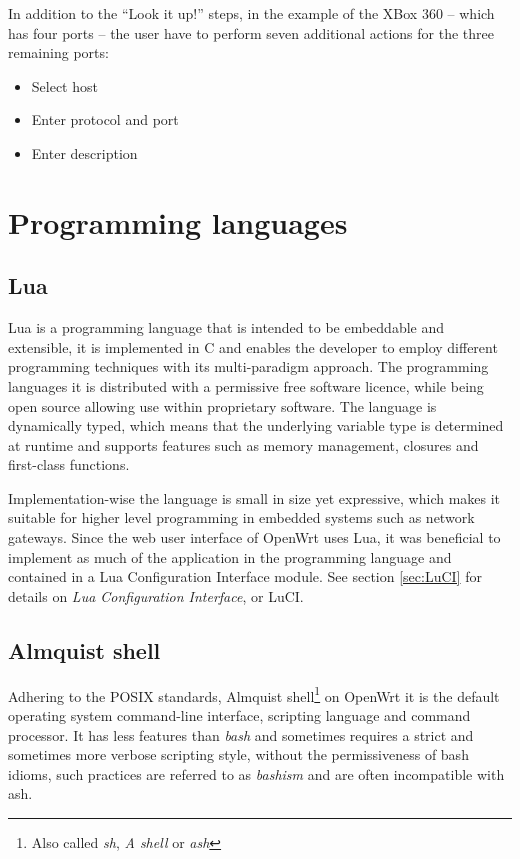 \documentclass[a4paper,11pt,makeidx]{kth-bcs}
\begin{document}
In addition to the ``Look it up!'' steps, in the example of the XBox 360 -- which has four ports -- the user have to perform seven additional actions for the three remaining ports:
\begin{itemize}
   \item Select host
   \item Enter protocol and port
   \item Enter description
\end{itemize}

\section{Programming languages}
\subsection{Lua}
Lua is a programming language that is intended to be embeddable and extensible, it is implemented in C and enables the developer to employ different programming techniques with its multi-paradigm approach.
The programming languages it is distributed with a permissive free software licence\cite{mit-license}, while being open source allowing use within proprietary software.
The language is dynamically typed, which means that the underlying variable type is determined at runtime and supports features such as memory management, closures and first-class functions.\nocite{ierusalimschy2006programming}

Implementation-wise the language is small in size yet expressive, which makes it suitable for higher level programming in embedded systems such as network gateways.
Since the web user interface of OpenWrt uses Lua, it was beneficial to implement as much of the application in the programming language and contained in a Lua Configuration Interface module.
See section \ref{sec:LuCI} for details on \emph{Lua Configuration Interface}, or LuCI.

\subsection{Almquist shell}
Adhering to the POSIX standards, Almquist shell\footnote{Also called \emph{sh}, \emph{A shell} or \emph{ash}} on OpenWrt it is the default operating system command-line interface, scripting language and command processor.
It has less features than \emph{bash} and sometimes requires a strict and sometimes more verbose scripting style, without the permissiveness of bash idioms, such practices are referred to as \emph{bashism} and are often incompatible with ash.
\end{document}
